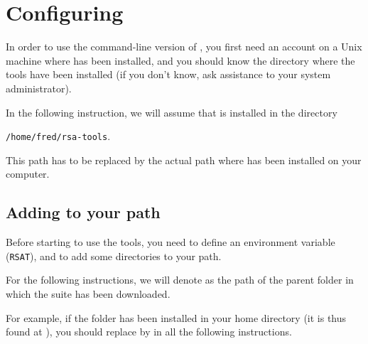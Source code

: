 \section{Configuring \RSAT}


In order to use the command-line version of \RSAT, you first need an
account on a Unix machine where \RSAT has been installed, and you
should know the directory where the tools have been installed (if you
don't know, ask assistance to your system administrator).

In the following instruction, we will assume that \RSAT is installed
in the directory 

\texttt{/home/fred/rsa-tools}. 

This path has to be
replaced by the actual path where \RSAT has been installed on your
computer.

\subsection{Adding \RSAT  to your path}

Before starting to use the tools, you need to define an environment
variable (\texttt{RSAT}), and to add some directories to your path.

For the following instructions, we will denote as 
the path of the parent folder in which the \RSAT suite has been
downloaded.

For example, if the  folder has been installed in your
home directory (it is thus found at ), you
should replace  by  in all the
following instructions. 


